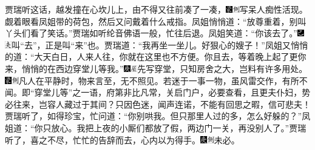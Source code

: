 贾瑞听这话，越发撞在心坎儿上，由不得又往前凑了一凑，{\includegraphics[width=3mm]{../Images/00006}\includegraphics[width=3mm]{../Images/00011}\footnotesize \kaishu 写呆人痴性活现。}觑着眼看凤姐带的荷包，然后又问戴着什么戒指。凤姐悄悄道：“放尊重着，别叫丫头们看了笑话。”贾瑞如听纶音佛语一般，忙往后退。凤姐笑道：“你该去了。”{\includegraphics[width=3mm]{../Images/00003}\includegraphics[width=3mm]{../Images/00012}\footnotesize \kaishu 叫“去”，正是叫“来”也。}贾瑞道：“我再坐一坐儿。好狠心的嫂子！”凤姐又悄悄的道：“大天白日，人来人往，你就在这里也不方便。你且去，等着晚上起了更你来，悄悄的在西边穿堂儿等我。”{{\includegraphics[width=3mm]{../Images/00004}\includegraphics[width=3mm]{../Images/00010}\footnotesize \kaishu 先写穿堂，只知房舍之大，岂料有许多用处。　}\includegraphics[width=3mm]{../Images/00006}\includegraphics[width=3mm]{../Images/00011}\footnotesize \kaishu 凡人在平静时，物来言至，无不照见。若迷于一事一物，虽风雷交作，有所不闻。即“穿堂儿等”之一语，府第非比凡常，关启门户，必要查看，且更夫仆妇，势必往来，岂容人藏过于其间？只因色迷，闻声连诺，不能有回思之暇，信可悲夫！}贾瑞听了，如得珍宝，忙问道：“你别哄我。但只那里人过的多，怎么好躲的？”凤姐道：“你只放心。我把上夜的小厮们都放了假，两边门一关，再没别人了。”贾瑞听了，喜之不尽，忙忙的告辞而去，心内以为得手。{\includegraphics[width=3mm]{../Images/00004}\includegraphics[width=3mm]{../Images/00011}\footnotesize \kaishu 未必。}

